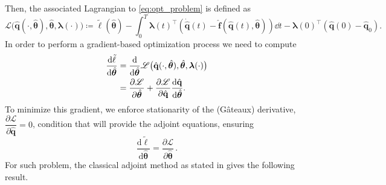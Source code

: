 Then, the associated Lagrangian to \eqref{eq:opt_problem} is defined as\\
\begin{equation*}
        \mathscr{L}\bigl(\hat{\mathbf{q}}(\cdot,\hat{\bm{\theta}}),\hat{\bm{\theta}},\bm{\lambda}(\cdot)\bigr) \coloneqq \tilde{\ell}(\hat{\bm{\theta}}) - \int_0^T \bm{\lambda}(t)^{\top}\left( \dot{\hat{\mathbf{q}}}(t)-\hat{\mathbf{f}}(\hat{\mathbf{q}}(t),\hat{\bm{\theta}}) \right)\dd t - \bm{\lambda}(0)^{\top}(\hat{\mathbf{q}}(0)-\hat{\mathbf{q}}_0).
        \label{eq:lagrange_cost}
    \end{equation*}
In order to perform a gradient-based optimization process we need to compute\\
\begin{align*}
    \dv{\tilde{\ell}}{\hat{\bm{\theta}}} &= \dv{}{\hat{\bm{\theta}}} \mathscr{L}\bigl(\hat{\mathbf{q}}(\cdot,\hat{\bm{\theta}}),\hat{\bm{\theta}},\bm{\lambda}(\cdot)\bigr) \\
    &= \dfrac{\partial\mathscr{L}}{\partial\hat{\bm{\theta}}} + \dfrac{\partial\mathscr{L}}{\partial\hat{\mathbf{q}}} \dfrac{\textrm{d}\hat{\mathbf{q}}}{\textrm{d}\hat{\bm{\theta}}}.
\end{align*}
To minimize this gradient, we enforce stationarity of the (Gâteaux) derivative, $\dfrac{\partial\mathscr{L}}{\partial\hat{\mathbf{q}}} = 0$, condition that will provide the adjoint equations, ensuring\\
\begin{equation}
  \label{eq:equal_grad}
  \frac{\mathrm{d}\tilde{\ell}}{\mathrm{d}\hat{\bm{\theta}}}
  = \frac{\partial\mathscr{L}}{\partial\hat{\bm{\theta}}}\,.
\end{equation}
For such problem, the classical adjoint method as stated in \cite{bradley2024pde,luchini2024introduction} gives the following result.

